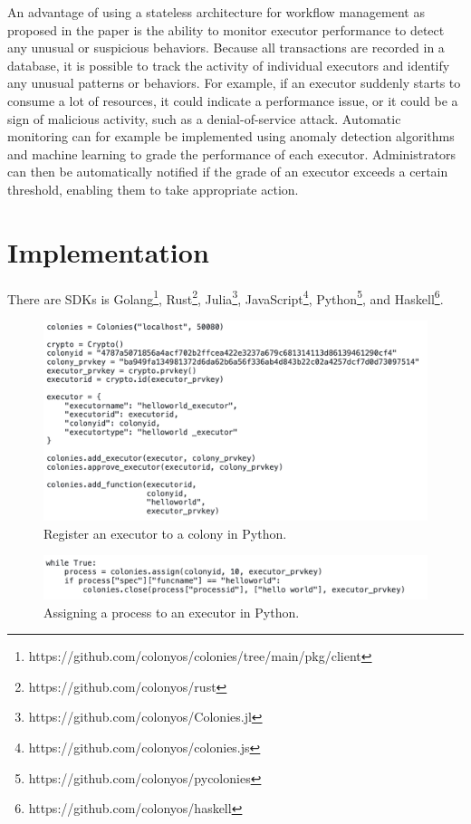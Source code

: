 \documentclass{article}
\begin{document}
An advantage of using a stateless architecture for workflow management as proposed in the paper is the ability to monitor executor performance to detect any unusual or suspicious behaviors. Because all transactions are recorded in a database, it is possible to track the activity of individual executors and identify any unusual patterns or behaviors. For example, if an executor suddenly starts to consume a lot of resources, it could indicate a performance issue, or it could be a sign of malicious activity, such as a denial-of-service attack. Automatic monitoring can for example be implemented using anomaly detection algorithms and machine learning to grade the performance of each executor. Administrators can then be automatically notified if the grade of an executor exceeds a certain threshold, enabling them to take appropriate action.

\section{Implementation}
There are SDKs is Golang\footnote{https://github.com/colonyos/colonies/tree/main/pkg/client}, Rust\footnote{https://github.com/colonyos/rust}, Julia\footnote{https://github.com/colonyos/Colonies.jl}, JavaScript\footnote{https://github.com/colonyos/colonies.js}, Python\footnote{https://github.com/colonyos/pycolonies}, and Haskell\footnote{https://github.com/colonyos/haskell}.

\begin{figure}[h]
	\centering
    \includegraphics[scale=0.35]{executor_code.png}
	\caption{Register an executor to a colony in Python.}
	\label{fig:dashboard1}
\end{figure}

\begin{figure}[h]
	\centering
    \includegraphics[scale=0.35]{assign_code.png}
	\caption{Assigning a process to an executor in Python.}
	\label{fig:dashboard1}
\end{figure}
\end{document}
